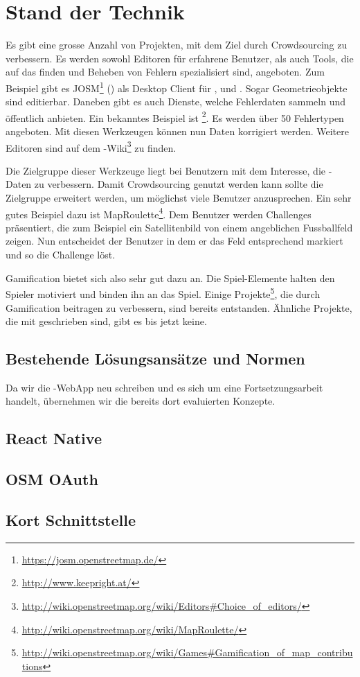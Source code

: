 \chapter{Stand der Technik}
\label{tb-stand-der-technik}
Es gibt eine grosse Anzahl von Projekten, mit dem Ziel  durch \gls{Crowdsourcing} zu verbessern.
Es werden sowohl Editoren für erfahrene Benutzer, als auch Tools, die auf das finden und Beheben von Fehlern spezialisiert sind, angeboten.
Zum Beispiel gibt es JOSM\footnote{\url{https://josm.openstreetmap.de/}} () als Desktop Client für ,  und .
Sogar Geometrieobjekte sind editierbar.
Daneben gibt es auch Dienste, welche Fehlerdaten sammeln und öffentlich anbieten.
Ein bekanntes Beispiel ist \footnote{\url{http://www.keepright.at/}}.
Es werden über 50 Fehlertypen angeboten.
Mit diesen Werkzeugen können nun Daten korrigiert werden.
Weitere Editoren sind auf dem -Wiki\footnote{\url{http://wiki.openstreetmap.org/wiki/Editors\#Choice_of_editors/}} zu finden.

Die Zielgruppe dieser Werkzeuge liegt bei Benutzern mit dem Interesse, die -Daten zu verbessern.
Damit \gls{Crowdsourcing} genutzt werden kann sollte die Zielgruppe erweitert werden, um möglichst viele Benutzer anzusprechen.
Ein sehr gutes Beispiel dazu ist MapRoulette\footnote{\url{http://wiki.openstreetmap.org/wiki/MapRoulette/}}.
Dem Benutzer werden Challenges präsentiert, die zum Beispiel ein Satellitenbild von einem angeblichen Fussballfeld zeigen. 
Nun entscheidet der Benutzer in dem er das Feld entsprechend markiert und so die Challenge löst.

\gls{Gamification} bietet sich also sehr gut dazu an.
Die Spiel-Elemente halten den Spieler motiviert und binden ihn an das Spiel.
Einige Projekte\footnote{\url{http://wiki.openstreetmap.org/wiki/Games\#Gamification_of_map_contributions}}, die durch \gls{Gamification} beitragen  zu verbessern, sind bereits entstanden.
Ähnliche Projekte, die mit  geschrieben sind, gibt es bis jetzt keine.


\section{Bestehende Lösungsansätze und Normen}
Da wir die \kort{}-\gls{WebApp} neu schreiben und es sich um eine Fortsetzungsarbeit handelt, übernehmen wir die bereits dort evaluierten Konzepte.


\section{React Native}


\section{OSM OAuth}


\section{Kort Schnittstelle}

